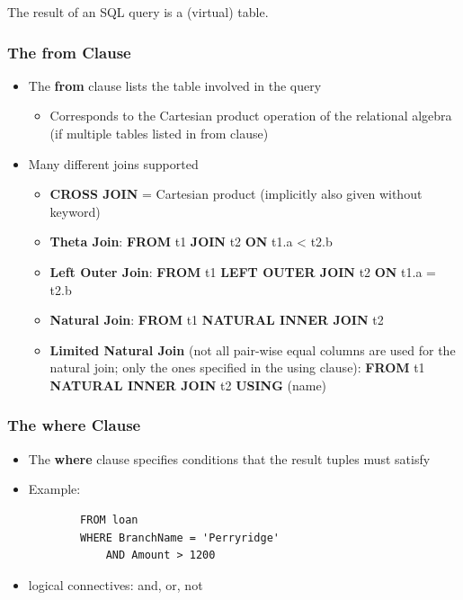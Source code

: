 The result of an SQL query is a (virtual) table.

\subsubsection{The from Clause}

\begin{itemize}
    \item The \textbf{from} clause lists the table involved in the query
    \begin{itemize}
        \item Corresponds to the Cartesian product operation of the relational algebra (if multiple tables listed in from clause)
    \end{itemize}
    \item Many different joins supported
    \begin{itemize}
        \item \textbf{CROSS JOIN} = Cartesian product (implicitly also given without keyword)
        \item \textbf{Theta Join}: \quad \textbf{FROM} t1 \textbf{JOIN} t2 \textbf{ON} t1.a < t2.b
        \item \textbf{Left Outer Join}: \quad \textbf{FROM} t1 \textbf{LEFT OUTER JOIN} t2 \textbf{ON} t1.a = t2.b
        \item \textbf{Natural Join}:  \quad \textbf{FROM} t1 \textbf{NATURAL INNER JOIN} t2 
        \item \textbf{Limited Natural Join} (not all pair-wise equal columns are used for the natural join; only the ones specified in the using clause):  \quad \textbf{FROM} t1 \textbf{NATURAL INNER JOIN} t2 \textbf{USING} (name)
    \end{itemize}
\end{itemize}

\subsubsection{The where Clause}

\begin{itemize}
    \item The \textbf{where} clause specifies conditions that the result tuples must satisfy
    \item Example:
    \begin{lstlisting}
        FROM loan
        WHERE BranchName = 'Perryridge' 
            AND Amount > 1200
    \end{lstlisting}
    \item logical connectives: and, or, not
\end{itemize}

